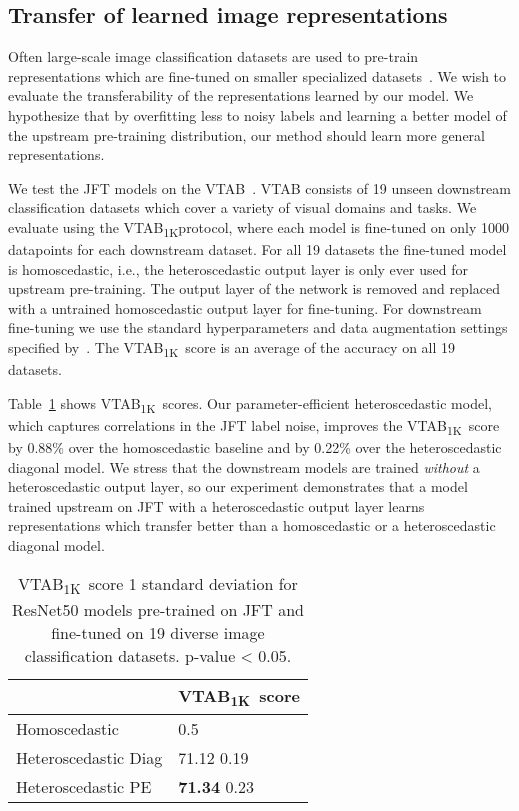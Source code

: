 \documentclass[final]{cvpr}
\newcommand{\vtab}{VTAB\textsubscript{1K}}
\begin{document}
\subsection{Transfer of learned image representations}
\label{sec:rep_learning}

Often large-scale image classification datasets are used to pre-train representations which are fine-tuned on smaller specialized datasets~\cite{zhai2020largescale,kolesnikov2019big,sun2017revisiting,djolonga2020robustness,raghu2019transfusion}. We wish to evaluate the transferability of the representations learned by our model. We hypothesize that by overfitting less to noisy labels and learning a better model of the upstream pre-training distribution, our method should learn more general representations.

We test the JFT models on the VTAB~\cite{zhai2020largescale}. VTAB consists of 19 unseen downstream classification datasets which cover a variety of visual domains and tasks. We evaluate using the \vtab protocol, where each model is fine-tuned on only 1000 datapoints for each downstream dataset. For all 19 datasets the fine-tuned model is homoscedastic, i.e., the heteroscedastic output layer is only ever used for upstream pre-training. The output layer of the network is removed and replaced with a untrained homoscedastic output layer for fine-tuning. For downstream fine-tuning we use the standard hyperparameters and data augmentation settings specified by~\citet{kolesnikov2019big}. The \vtab~score is an average of the accuracy on all 19 datasets.

Table~\ref{tab:vtab} shows \vtab~scores. Our parameter-efficient heteroscedastic model, which captures correlations in the JFT label noise, improves the \vtab~score by 0.88\% over the homoscedastic baseline and by 0.22\% over the heteroscedastic diagonal model. We stress that the downstream models are trained \textit{without} a heteroscedastic output layer, so our experiment demonstrates that a model trained upstream on JFT with a heteroscedastic output layer learns representations which transfer better than a homoscedastic or a heteroscedastic diagonal model.

\begin{table}[]
\centering
\begin{tabular}{@{}ll@{}}
\toprule
 & \vtab~score \\ \midrule
Homoscedastic &   0.5 \\
Heteroscedastic Diag & 71.12  0.19 \\
Heteroscedastic PE & \textbf{71.34}  0.23 \\ \bottomrule
\end{tabular}
\caption{\vtab~score  1 standard deviation for ResNet50 models pre-trained on JFT and fine-tuned on 19 diverse image classification datasets.  p-value < 0.05.}
\label{tab:vtab}
\end{table}
\end{document}
